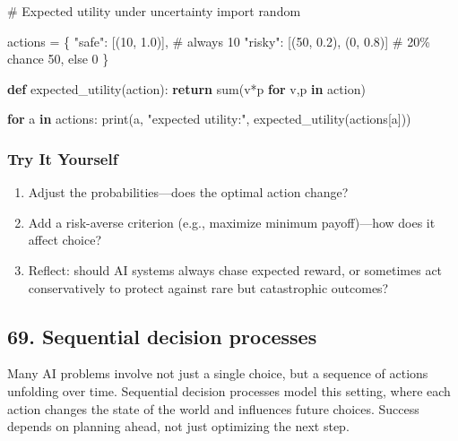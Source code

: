 \documentclass[
  letterpaper,
  DIV=11,
  numbers=noendperiod]{scrreprt}
\newenvironment{Shaded}{\begin{snugshade}}{\end{snugshade}}
\newcommand{\BuiltInTok}[1]{\textcolor[rgb]{0.00,0.23,0.31}{#1}}
\newcommand{\CommentTok}[1]{\textcolor[rgb]{0.37,0.37,0.37}{#1}}
\newcommand{\ControlFlowTok}[1]{\textcolor[rgb]{0.00,0.23,0.31}{\textbf{#1}}}
\newcommand{\DecValTok}[1]{\textcolor[rgb]{0.68,0.00,0.00}{#1}}
\newcommand{\FloatTok}[1]{\textcolor[rgb]{0.68,0.00,0.00}{#1}}
\newcommand{\ImportTok}[1]{\textcolor[rgb]{0.00,0.46,0.62}{#1}}
\newcommand{\KeywordTok}[1]{\textcolor[rgb]{0.00,0.23,0.31}{\textbf{#1}}}
\newcommand{\NormalTok}[1]{\textcolor[rgb]{0.00,0.23,0.31}{#1}}
\newcommand{\OperatorTok}[1]{\textcolor[rgb]{0.37,0.37,0.37}{#1}}
\newcommand{\StringTok}[1]{\textcolor[rgb]{0.13,0.47,0.30}{#1}}
\providecommand{\tightlist}{%
  \setlength{\itemsep}{0pt}\setlength{\parskip}{0pt}}
\begin{document}
\begin{Shaded}
\begin{Highlighting}[]
\CommentTok{\# Expected utility under uncertainty}
\ImportTok{import}\NormalTok{ random}

\NormalTok{actions }\OperatorTok{=}\NormalTok{ \{}
    \StringTok{"safe"}\NormalTok{: [(}\DecValTok{10}\NormalTok{, }\FloatTok{1.0}\NormalTok{)],           }\CommentTok{\# always 10}
    \StringTok{"risky"}\NormalTok{: [(}\DecValTok{50}\NormalTok{, }\FloatTok{0.2}\NormalTok{), (}\DecValTok{0}\NormalTok{, }\FloatTok{0.8}\NormalTok{)] }\CommentTok{\# 20\% chance 50, else 0}
\NormalTok{\}}

\KeywordTok{def}\NormalTok{ expected\_utility(action):}
    \ControlFlowTok{return} \BuiltInTok{sum}\NormalTok{(v}\OperatorTok{*}\NormalTok{p }\ControlFlowTok{for}\NormalTok{ v,p }\KeywordTok{in}\NormalTok{ action)}

\ControlFlowTok{for}\NormalTok{ a }\KeywordTok{in}\NormalTok{ actions:}
    \BuiltInTok{print}\NormalTok{(a, }\StringTok{"expected utility:"}\NormalTok{, expected\_utility(actions[a]))}
\end{Highlighting}
\end{Shaded}

\subsubsection{Try It Yourself}\label{try-it-yourself-67}

\begin{enumerate}
\def\labelenumi{\arabic{enumi}.}
\tightlist
\item
  Adjust the probabilities---does the optimal action change?
\item
  Add a risk-averse criterion (e.g., maximize minimum payoff)---how does
  it affect choice?
\item
  Reflect: should AI systems always chase expected reward, or sometimes
  act conservatively to protect against rare but catastrophic outcomes?
\end{enumerate}

\subsection{69. Sequential decision
processes}\label{sequential-decision-processes}

Many AI problems involve not just a single choice, but a sequence of
actions unfolding over time. Sequential decision processes model this
setting, where each action changes the state of the world and influences
future choices. Success depends on planning ahead, not just optimizing
the next step.
\end{document}
